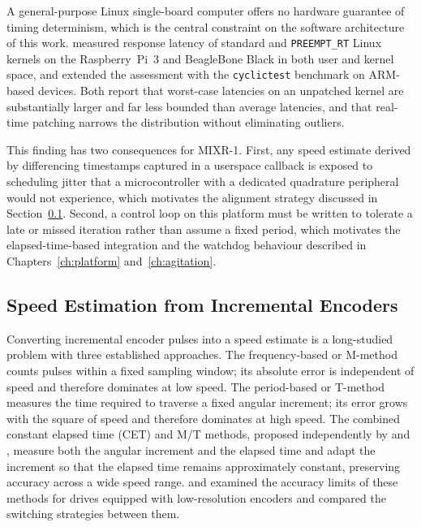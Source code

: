 A general-purpose Linux single-board computer offers no hardware guarantee of timing determinism, which is the central constraint on the software architecture of this work. \citet{adam2021computers} measured response latency of standard and \texttt{PREEMPT\_RT} Linux kernels on the Raspberry~Pi~3 and BeagleBone Black in both user and kernel space, and \citet{adam2021electronics} extended the assessment with the \texttt{cyclictest} benchmark on ARM-based devices. Both report that worst-case latencies on an unpatched kernel are substantially larger and far less bounded than average latencies, and that real-time patching narrows the distribution without eliminating outliers.

This finding has two consequences for MIXR-1. First, any speed estimate derived by differencing timestamps captured in a userspace callback is exposed to scheduling jitter that a microcontroller with a dedicated quadrature peripheral would not experience, which motivates the alignment strategy discussed in Section~\ref{subsec:rrl-encoder}. Second, a control loop on this platform must be written to tolerate a late or missed iteration rather than assume a fixed period, which motivates the elapsed-time-based integration and the watchdog behaviour described in Chapters~\ref{ch:platform} and~\ref{ch:agitation}.

\subsection{Speed Estimation from Incremental Encoders}
\label{subsec:rrl-encoder}

Converting incremental encoder pulses into a speed estimate is a long-studied problem with three established approaches. The frequency-based or M-method counts pulses within a fixed sampling window; its absolute error is independent of speed and therefore dominates at low speed. The period-based or T-method measures the time required to traverse a fixed angular increment; its error grows with the square of speed and therefore dominates at high speed. The combined constant elapsed time (CET) and M/T methods, proposed independently by \citet{ohmae1982} and \citet{bonert1983}, measure both the angular increment and the elapsed time and adapt the increment so that the elapsed time remains approximately constant, preserving accuracy across a wide speed range. \citet{briz1994} and \citet{petrella2007} examined the accuracy limits of these methods for drives equipped with low-resolution encoders and compared the switching strategies between them.

